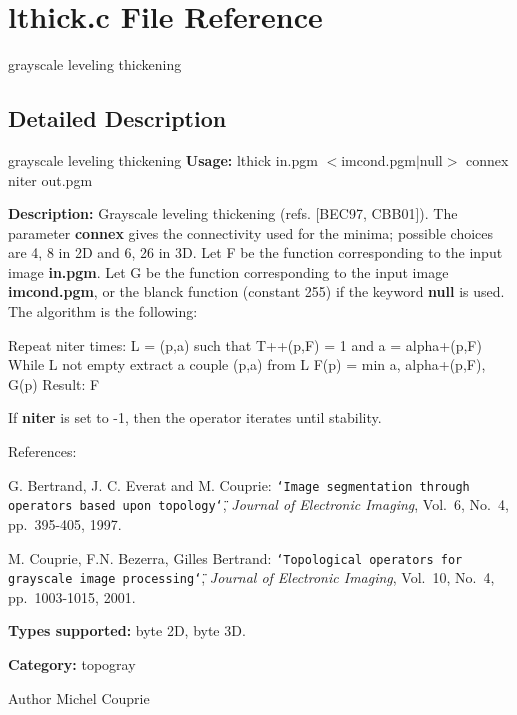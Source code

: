 \section{lthick.c File Reference}
\label{lthick_8c}


grayscale leveling thickening  




\subsection{Detailed Description}
grayscale leveling thickening {\bfseries Usage:} lthick in.pgm $<$imcond.pgm$|$null$>$ connex niter out.pgm

{\bfseries Description:} Grayscale leveling thickening (refs. [BEC97, CBB01]). The parameter {\bfseries connex} gives the connectivity used for the minima; possible choices are 4, 8 in 2D and 6, 26 in 3D. Let F be the function corresponding to the input image {\bfseries in.pgm}. Let G be the function corresponding to the input image {\bfseries imcond.pgm}, or the blanck function (constant 255) if the keyword {\bfseries null} is used. The algorithm is the following:

\begin{DoxyVerb}
Repeat niter times:
    L = {(p,a) such that T++(p,F) = 1 and a = alpha+(p,F)}
    While L not empty
       extract a couple (p,a) from L
       F(p) = min{ a, alpha+(p,F), G(p) }    
Result: F
\end{DoxyVerb}


If {\bfseries niter} is set to -\/1, then the operator iterates until stability.

References:\par
 [BEC97] G. Bertrand, J. C. Everat and M. Couprie: {\tt \char`\"{}Image segmentation through operators based upon topology\char`\"{}}, {\itshape  Journal of Electronic Imaging\/}, Vol.~6, No.~4, pp.~395-\/405, 1997.\par
 [CBB01] M. Couprie, F.N. Bezerra, Gilles Bertrand: {\tt \char`\"{}Topological operators for
grayscale image processing\char`\"{}}, {\itshape  Journal of Electronic Imaging\/}, Vol.~10, No.~4, pp.~1003-\/1015, 2001.

{\bfseries Types supported:} byte 2D, byte 3D.

{\bfseries Category:} topogray

\begin{DoxyAuthor}{Author}
Michel Couprie 
\end{DoxyAuthor}
